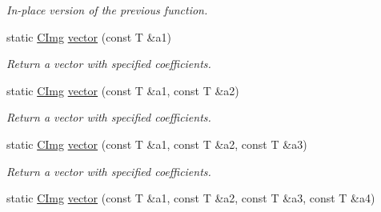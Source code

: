\begin{DoxyCompactItemize}
\begin{DoxyCompactList}\small\item\em In-\/place version of the previous function. \item\end{DoxyCompactList}\item 
\hypertarget{structcimg__library_1_1_c_img_afbe2f5fb97689bcd7c905212ace2e17f}{
static \hyperlink{structcimg__library_1_1_c_img}{CImg} \hyperlink{structcimg__library_1_1_c_img_afbe2f5fb97689bcd7c905212ace2e17f}{vector} (const T \&a1)}
\label{structcimg__library_1_1_c_img_afbe2f5fb97689bcd7c905212ace2e17f}

\begin{DoxyCompactList}\small\item\em Return a vector with specified coefficients. \item\end{DoxyCompactList}\item 
\hypertarget{structcimg__library_1_1_c_img_a54b2ca1d004143e30074daa6d6a7f61a}{
static \hyperlink{structcimg__library_1_1_c_img}{CImg} \hyperlink{structcimg__library_1_1_c_img_a54b2ca1d004143e30074daa6d6a7f61a}{vector} (const T \&a1, const T \&a2)}
\label{structcimg__library_1_1_c_img_a54b2ca1d004143e30074daa6d6a7f61a}

\begin{DoxyCompactList}\small\item\em Return a vector with specified coefficients. \item\end{DoxyCompactList}\item 
\hypertarget{structcimg__library_1_1_c_img_a0e95b60ef89c8c9954e6e2ffb56b99cb}{
static \hyperlink{structcimg__library_1_1_c_img}{CImg} \hyperlink{structcimg__library_1_1_c_img_a0e95b60ef89c8c9954e6e2ffb56b99cb}{vector} (const T \&a1, const T \&a2, const T \&a3)}
\label{structcimg__library_1_1_c_img_a0e95b60ef89c8c9954e6e2ffb56b99cb}

\begin{DoxyCompactList}\small\item\em Return a vector with specified coefficients. \item\end{DoxyCompactList}\item 
\hypertarget{structcimg__library_1_1_c_img_a289003ce5fb090e80e52ed2d1a999bb3}{
static \hyperlink{structcimg__library_1_1_c_img}{CImg} \hyperlink{structcimg__library_1_1_c_img_a289003ce5fb090e80e52ed2d1a999bb3}{vector} (const T \&a1, const T \&a2, const T \&a3, const T \&a4)}
\label{structcimg__library_1_1_c_img_a289003ce5fb090e80e52ed2d1a999bb3}


\end{DoxyCompactItemize}
